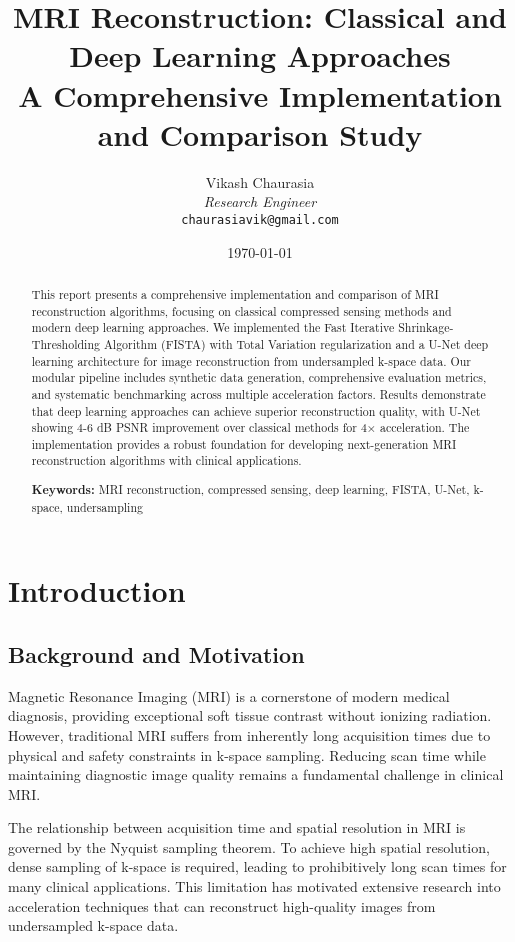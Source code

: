 \documentclass[11pt,a4paper]{article}
\title{
    \Large \textbf{MRI Reconstruction: Classical and Deep Learning Approaches} \\
    \vspace{0.5cm}
    \large A Comprehensive Implementation and Comparison Study
}
\author{
    Vikash Chaurasia \\
    \textit{Research Engineer} \\
    \texttt{chaurasiavik@gmail.com} 
}
\date{\today}
\begin{document}
\maketitle

\begin{abstract}
This report presents a comprehensive implementation and comparison of MRI reconstruction algorithms, focusing on classical compressed sensing methods and modern deep learning approaches. We implemented the Fast Iterative Shrinkage-Thresholding Algorithm (FISTA) with Total Variation regularization and a U-Net deep learning architecture for image reconstruction from undersampled k-space data. Our modular pipeline includes synthetic data generation, comprehensive evaluation metrics, and systematic benchmarking across multiple acceleration factors. Results demonstrate that deep learning approaches can achieve superior reconstruction quality, with U-Net showing 4-6 dB PSNR improvement over classical methods for 4× acceleration. The implementation provides a robust foundation for developing next-generation MRI reconstruction algorithms with clinical applications.

\textbf{Keywords:} MRI reconstruction, compressed sensing, deep learning, FISTA, U-Net, k-space, undersampling
\end{abstract}

\tableofcontents
\newpage

\section{Introduction}

\subsection{Background and Motivation}

Magnetic Resonance Imaging (MRI) is a cornerstone of modern medical diagnosis, providing exceptional soft tissue contrast without ionizing radiation. However, traditional MRI suffers from inherently long acquisition times due to physical and safety constraints in k-space sampling. Reducing scan time while maintaining diagnostic image quality remains a fundamental challenge in clinical MRI.

The relationship between acquisition time and spatial resolution in MRI is governed by the Nyquist sampling theorem. To achieve high spatial resolution, dense sampling of k-space is required, leading to prohibitively long scan times for many clinical applications. This limitation has motivated extensive research into acceleration techniques that can reconstruct high-quality images from undersampled k-space data.
\end{document}
